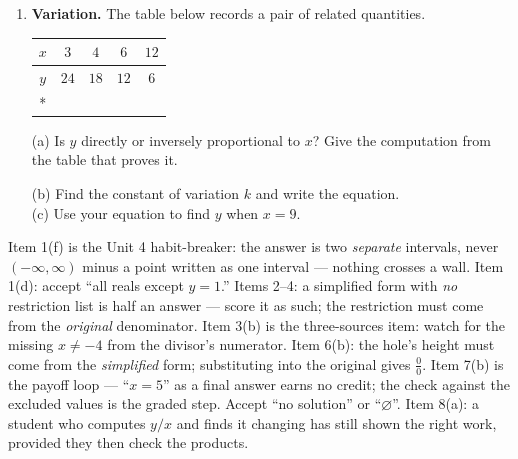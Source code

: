 \documentclass[10pt]{article}
\begin{document}
\begin{enumerate}[leftmargin=1.9em, itemsep=10pt]
  \item \textbf{Variation.} The table below records a pair of related quantities.
        \begin{center}
        \renewcommand{\arraystretch}{1.25}
        \begin{tabular}{|c|c|c|c|c|}
        \hline
        $x$ & $3$ & $4$ & $6$ & $12$ \\ \hline
        $y$ & $24$ & $18$ & $12$ & $6$ \\* \hline
        \end{tabular}
        \end{center}
        (a) Is $y$ directly or inversely proportional to $x$? Give the computation from the table that
            proves it.
 \rubricbox{\gradedblank[id=qc8a, type=rubric, points=1, rubric={../rubrics/alg2-u04-actual-test-qc8a.yaml}, display={Inversely --- the \emph{products} are constant: $3\cdot24=4\cdot18=6\cdot12=12\cdot6=72$ (the ratios $y/x$ are not)}]{\linewidth}{10pt}}\par
        (b) Find the constant of variation $k$ and write the equation. \inblank{\blank{5.0cm}}{\gradedblank[id=qc8b, type=short, points=1, answer={y=72/x}, display={$k=72$, so $y=72/x$}]{5.0cm-2pt}{10pt}}
        \\[4pt]
        (c) Use your equation to find $y$ when $x=9$. \inblank{\blank{3.0cm}}{\gradedblank[id=qc8c, type=short, points=1, answer={8}, check=numeric, display={$y=72/9=8$}]{3.0cm-2pt}{10pt}}
\end{enumerate}

\begin{teachernote}
Item 1(f) is the Unit 4 habit-breaker: the answer is two \emph{separate} intervals, never
$(-\infty,\infty)$ minus a point written as one interval --- nothing crosses a wall. Item 1(d):
accept ``all reals except $y=1$.'' Items 2--4: a simplified form with \emph{no} restriction list is
half an answer --- score it as such; the restriction must come from the \emph{original} denominator.
Item 3(b) is the three-sources item: watch for the missing $x\ne-4$ from the divisor's numerator.
Item 6(b): the hole's height must come from the \emph{simplified} form; substituting into the
original gives $\tfrac00$. Item 7(b) is the payoff loop --- ``$x=5$'' as a final answer earns no
credit; the check against the excluded values is the graded step. Accept ``no solution'' or
``$\varnothing$''. Item 8(a): a student who computes $y/x$ and finds it changing has still shown
the right work, provided they then check the products.
\end{teachernote}
\end{document}
